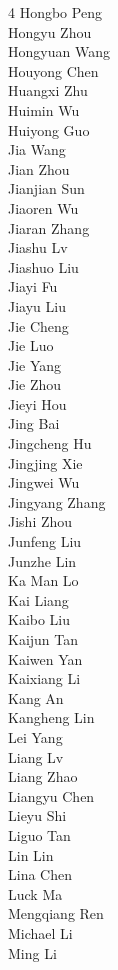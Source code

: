 \begin{multicols}{4}
Hongbo Peng \\
Hongyu Zhou \\
Hongyuan Wang \\
Houyong Chen \\
Huangxi Zhu \\
Huimin Wu \\
Huiyong Guo \\
Jia Wang \\
Jian Zhou \\
Jianjian Sun \\
Jiaoren Wu \\
Jiaran Zhang \\
Jiashu Lv \\
Jiashuo Liu \\
Jiayi Fu \\
Jiayu Liu \\
Jie Cheng \\
Jie Luo \\
Jie Yang \\
Jie Zhou \\
Jieyi Hou \\
Jing Bai \\
Jingcheng Hu \\
Jingjing Xie \\
Jingwei Wu \\
Jingyang Zhang \\
Jishi Zhou \\
Junfeng Liu \\
Junzhe Lin \\
Ka Man Lo \\
Kai Liang \\
Kaibo Liu \\
Kaijun Tan \\
Kaiwen Yan \\
Kaixiang Li \\
Kang An \\
Kangheng Lin \\
Lei Yang \\
Liang Lv \\
Liang Zhao \\
Liangyu Chen \\
Lieyu Shi \\
Liguo Tan \\
Lin Lin \\
Lina Chen \\
Luck Ma \\
Mengqiang Ren \\
Michael Li \\
Ming Li \\

\end{multicols}
